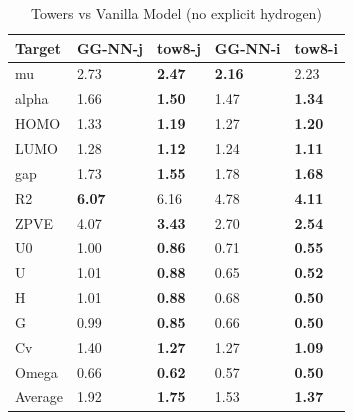 \documentclass{article}
\begin{document}
\begin{table}[t]
\centering
\caption{Towers vs Vanilla Model (no explicit hydrogen)}
\label{tb:towers2}
\begin{tabular}{l|ll|ll}
\hline
Target & GG-NN-j & tow8-j & GG-NN-i & tow8-i \\
\hline
mu & 2.73        & \textbf{2.47}           & \textbf{2.16}      & 2.23         \\
alpha & 1.66        & \textbf{1.50}           & 1.47      & \textbf{1.34}         \\
HOMO & 1.33        & \textbf{1.19}           & 1.27      & \textbf{1.20}         \\
LUMO & 1.28        & \textbf{1.12}           & 1.24      & \textbf{1.11}         \\
gap & 1.73        & \textbf{1.55}           & 1.78      & \textbf{1.68}         \\
R2 & \textbf{6.07}   & 6.16           & 4.78      & \textbf{4.11}         \\
ZPVE & 4.07        & \textbf{3.43}           & 2.70      & \textbf{2.54}         \\
U0 & 1.00        & \textbf{0.86}           & 0.71      & \textbf{0.55}         \\
U & 1.01        & \textbf{0.88}           & 0.65      & \textbf{0.52}         \\
H & 1.01        & \textbf{0.88}           & 0.68      & \textbf{0.50}         \\
G & 0.99        & \textbf{0.85}           & 0.66      & \textbf{0.50}         \\
Cv & 1.40        & \textbf{1.27}           & 1.27      & \textbf{1.09}         \\
Omega & 0.66        & \textbf{0.62}           & 0.57      & \textbf{0.50}         \\
\hline
Average & 1.92 & \textbf{1.75} & 1.53 & \textbf{1.37}
\end{tabular}
\end{table}
\end{document}
